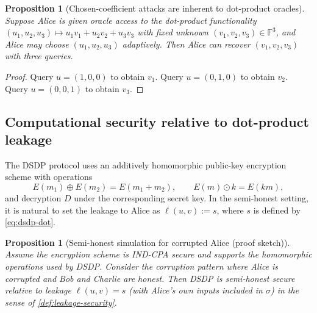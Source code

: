 \documentclass[11pt,a4paper]{article}
\newtheorem{proposition}[theorem]{Proposition}
\theoremstyle{definition}
\theoremstyle{remark}
\newcommand{\F}{\mathbb{F}}
\newcommand{\headd}{\mathbin{\oplus}}
\newcommand{\hesmul}{\mathbin{\odot}}
\begin{document}
\begin{proposition}[Chosen-coefficient attacks are inherent to dot-product oracles]
\label{prop:dsdp-oracle-recovery}
Suppose Alice is given oracle access to the dot-product functionality \((u_1,u_2,u_3)\mapsto u_1 v_1 + u_2 v_2 + u_3 v_3\) with fixed unknown \((v_1,v_2,v_3)\in\F^3\), and Alice may choose \((u_1,u_2,u_3)\) adaptively. Then Alice can recover \((v_1,v_2,v_3)\) with three queries.
\end{proposition}

\begin{proof}
Query \(u=(1,0,0)\) to obtain \(v_1\). Query \(u=(0,1,0)\) to obtain \(v_2\). Query \(u=(0,0,1)\) to obtain \(v_3\).
\end{proof}

\subsection{Computational security relative to dot-product leakage}
The DSDP protocol uses an additively homomorphic public-key encryption scheme with operations
\[
E(m_1)\headd E(m_2) = E(m_1+m_2),
\qquad
E(m)\hesmul k = E(km),
\]
and decryption \(D\) under the corresponding secret key. In the semi-honest setting, it is natural to set the leakage to Alice as \(\ell(u,v) := s\), where \(s\) is defined by \cref{eq:dsdp-dot}.

\begin{proposition}[Semi-honest simulation for corrupted Alice (proof sketch)]
\label{prop:dsdp-sim-alice}
Assume the encryption scheme is IND-CPA secure and supports the homomorphic operations used by DSDP. Consider the corruption pattern where Alice is corrupted and Bob and Charlie are honest. Then DSDP is semi-honest secure relative to leakage \(\ell(u,v)=s\) (with Alice's own inputs included in \(\sigma\)) in the sense of \cref{def:leakage-security}.
\end{proposition}
\end{document}
